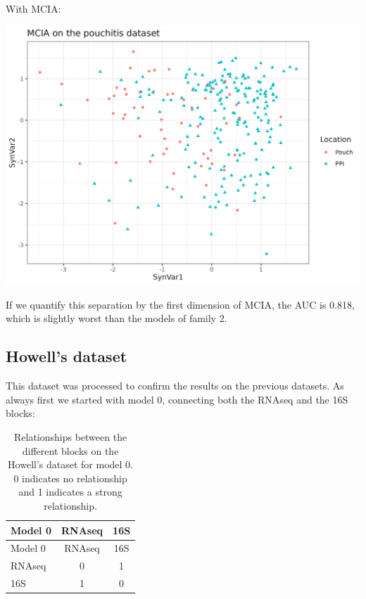 \documentclass[
  a4paper,
]{book}
\let\origfigure\figure
\let\endorigfigure\endfigure
\renewenvironment{figure}[1][2] {
    \expandafter\origfigure\expandafter[!ht]
} {
    \endorigfigure
}
\begin{document}
With MCIA:

\begin{figure}
\includegraphics[width=1\linewidth]{images/morgan-mcia} \caption[MCIA firsts dimensions on Morgan's dataset.]{MCIA firsts dimensions on Morgan's dataset. Color and shape is according to the location of the sample. There is some separation by location.}\label{fig:morgan-mcia-plot}
\end{figure}

If we quantify this separation by the first dimension of MCIA, the AUC is 0.818, which is slightly worst than the models of family 2.

\hypertarget{results-howell}{%
\subsection{Howell's dataset}\label{results-howell}}

This dataset was processed to confirm the results on the previous datasets.
As always first we started with model 0, connecting both the RNAseq and the 16S blocks:

\begin{longtable}[]{@{}lcc@{}}
\caption{\label{tab:howell-model0} Relationships between the different blocks on the Howell's dataset for model 0. 0 indicates no relationship and 1 indicates a strong relationship.}\tabularnewline
\toprule
Model 0 & RNAseq & 16S \\
\midrule
\endfirsthead
\toprule
Model 0 & RNAseq & 16S \\
\midrule
\endhead
RNAseq & 0 & 1 \\
16S & 1 & 0 \\
\bottomrule
\end{longtable}
\end{document}
